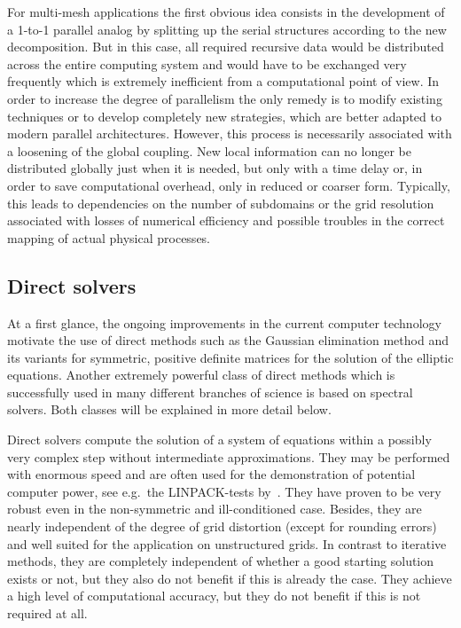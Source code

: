 For multi-mesh applications the first obvious idea consists in the development of a 1-to-1 parallel analog by splitting up the serial structures according to the new decomposition. But in this case, all required recursive data would be distributed across the entire computing system and would have to be exchanged very frequently which is extremely inefficient from a computational point of view.
In order to increase the degree of parallelism the only remedy is to modify existing techniques or to develop completely new strategies, which are better adapted to modern parallel architectures. However, this process is necessarily associated with a loosening of the global coupling.
New local information can no longer be distributed globally just when it is needed, but only with a time delay or, in order to save computational overhead, only in  reduced or coarser form. Typically, this leads to dependencies on the number of subdomains or the grid resolution associated with losses of numerical efficiency and possible troubles in the correct mapping of actual physical processes. 




\subsection{Direct solvers} 
\label{SEC_SCARC_direct_solvers}
At a first glance, the ongoing improvements in the current computer technology motivate the use of direct methods such as the Gaussian elimination method and its variants for symmetric, positive definite matrices for the solution of the elliptic equations. Another extremely powerful class of direct methods which is successfully used in many different branches of science is based on spectral solvers. 
Both classes will be explained in more detail below.

Direct solvers compute the solution of a system of equations within a possibly very complex step without intermediate approximations. They may be performed with enormous speed and are often used for the demonstration of potential computer power, see e.g.\ the LINPACK-tests by~\cite{Dongarra:1998}.
They have proven to be very robust even in the non-symmetric and ill-conditioned case. Besides, they are nearly independent of the  degree of grid distortion (except for rounding errors) and well suited for the application on unstructured grids.  
In contrast to iterative methods, they are completely independent of whether a good starting solution exists or not, but they also do not benefit if this is already the case. They achieve a high level of computational accuracy, but they do not benefit if this is not required at all.

